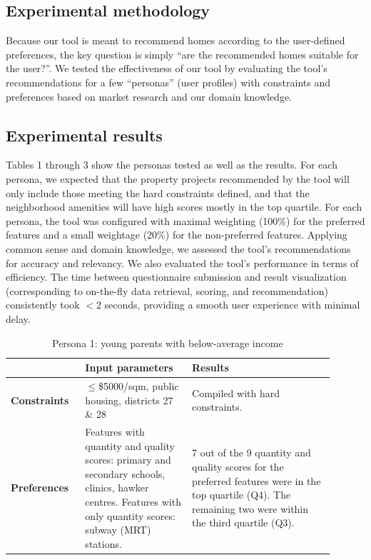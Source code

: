 \documentclass[a4paper, 11pt]{article}
\begin{document}
\subsection{Experimental methodology}

Because our tool is meant to recommend homes according to the user-defined preferences, the key question is simply “are the recommended homes suitable for the user?”. We tested the effectiveness of our tool by evaluating the tool's recommendations for a few “personas” (user profiles) with constraints and preferences based on market research and our domain knowledge.

\subsection{Experimental results}

Tables 1 through 3 show the personas tested as well as the results. For each persona, we expected that the property projects recommended by the tool will only include those meeting the hard constraints defined, and that the neighborhood amenities will have high scores mostly in the top quartile. For each persona, the tool was configured with maximal weighting (100\%) for the preferred features and a small weightage (20\%) for the non-preferred features. Applying common sense and domain knowledge, we assessed the tool's recommendations for accuracy and relevancy. We also evaluated the tool's performance in terms of efficiency. The time between questionnaire submission and result visualization (corresponding to on-the-fly data retrieval, scoring, and recommendation) consistently took $<2$ seconds, providing a smooth user experience with minimal delay.

\begin{table}[ht]
    \centering
    \begin{tabular}{p{0.2\linewidth} | p{0.3\linewidth} | p{0.4\linewidth}} \hline
      & \textbf{Input parameters}  & \textbf{Results} \\ \hline
      \textbf{Constraints}& $\leq$\$5000/sqm, public housing, districts 27 \& 28
  & Compiled with hard constraints. \\ \hline
\textbf{Preferences} & Features with quantity and quality scores: primary and secondary schools, clinics, hawker centres. Features with only quantity scores: subway (MRT) stations. & 7 out of the 9 quantity and quality scores for the preferred features were in the top quartile (Q4). The remaining two were within the third quartile (Q3). \\\hline
    \end{tabular}
    \caption{Persona 1: young parents with below-average income}
    \label{tab:my_label}
\end{table}
\end{document}
